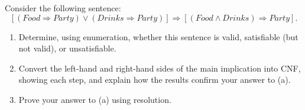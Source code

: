 \documentclass[cn,12pt]{homework}
\begin{document}
\newpage

\begin{problem}

Consider the following sentence:
\[
\left[ (Food \Rightarrow Party) \lor (Drinks \Rightarrow Party) \right] \Rightarrow \left[ (Food \land Drinks) \Rightarrow Party \right].
\]
\begin{enumerate}
    \item[a.] Determine, using enumeration, whether this sentence is valid, satisfiable (but not valid), or unsatisfiable.
    \item[b.] Convert the left-hand and right-hand sides of the main implication into CNF, showing each step, and explain how the results confirm your answer to (a).
    \item[c.] Prove your answer to (a) using resolution.
\end{enumerate}


\end{problem}
\end{document}
